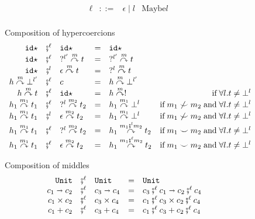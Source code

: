 \documentclass[acmsmall,review,anonymous]{acmart}\settopmatter{printfolios=true,printccs=false,printacmref=false}
\newcommand{\stxrule}[3]{#1 & ::= & #3 & \text{#2}\\}
\newcommand{\comprule}[4]{#1 & \fatsemi^\ell & #2 & = & #3 & #4 \\}
\newcommand{\comprulel}[4]{#1 & \fatsemi^l & #2 & = & #3 & #4 \\}
\newcommand{\plus}[0]{+}
\newcommand{\POOunit}[0]{\mathtt{Unit}}
\newcommand{\POOfun}[2]{#1 \shortrightarrow #2}
\newcommand{\POOprod}[2]{#1 \times #2}
\newcommand{\POOsum}[2]{#1 \plus #2}
\newcommand{\sidecond}[1]{\text{if}\;#1}
\newcommand{\hyperCoercionI}[0]{\mathtt{id\star}}
\newcommand{\hyperCoercionC}[3]{#1 \overset{#2}{\curvearrowright} #3}
\begin{document}
\begin{figure}
  \[
  \begin{array}{rclr}
  \stxrule{\ell}{Maybe$l$}{\epsilon \mid l}
  \end{array}
  \]
  
  Composition of hypercoercions 
  \[ 
  \begin{array}{rclclr}
  
  \comprule{
    \hyperCoercionI
  }{
    \hyperCoercionI
  }{
    \hyperCoercionI
  }{}
  
  \comprule{
    \hyperCoercionI
  }{
    \hyperCoercionC{?^{l'}}{m}{t}
  }{
    \hyperCoercionC{?^{l'}}{m}{t}
  }{}
  
  \comprulel{
    \hyperCoercionI
  }{
    \hyperCoercionC{\epsilon}{m}{t}
  }{
    \hyperCoercionC{?^{l}}{m}{t}
  }{}
  
  \comprule{
    \hyperCoercionC{h}{m}{\bot^{l'}}
  }{
    c
  }{
    \hyperCoercionC{h}{m}{\bot^{l'}}
  }{}
  
  \comprule{
    \hyperCoercionC{h}{m}{t}
  }{
    \hyperCoercionI
  }{
    \hyperCoercionC{h}{m}{!}
  }{
    \sidecond{\forall l. t \neq \bot^{l}}
  }
  
  \comprule{
    \hyperCoercionC{h_1}{m_1}{t_1}
  }{
    \hyperCoercionC{?^l}{m_2}{t_2}
  }{
    \hyperCoercionC{h_1}{m_1}{\bot^l}
  }{
    \sidecond{
       m_1 \not\smile m_2
      \; \text{and} \;
      \forall l. t \neq \bot^{l}
    }
  }

\comprulel{
\hyperCoercionC{h_1}{m_1}{t_1}
}{
\hyperCoercionC{\epsilon}{m_2}{t_2}
}{
\hyperCoercionC{h_1}{m_1}{\bot^l}
}{
\sidecond{
  m_1 \not\smile m_2
  \; \text{and} \;
  \forall l. t \neq \bot^{l}
}
}
\comprule{
\hyperCoercionC{h_1}{m_1}{t_1}
}{
\hyperCoercionC{?^l}{m_2}{t_2}
}{
\hyperCoercionC{h_1}{m_1 \fatsemi^{l} m_2}{t_2}
}{
\sidecond{
  m_1 \smile m_2
  \; \text{and} \;
  \forall l. t \neq \bot^{l}
}
}
  \comprule{
    \hyperCoercionC{h_1}{m_1}{t_1}
  }{
    \hyperCoercionC{\epsilon}{m_2}{t_2}
  }{
    \hyperCoercionC{h_1}{m_1 \fatsemi^{\ell} m_2}{t_2}
  }{
    \sidecond{
      m_1 \smile m_2
      \; \text{and} \;
      \forall l. t \neq \bot^{l}
    }
  }
  \end{array}
  \]
  
  Composition of middles 
  \[ 
  \begin{array}{rclclr}
  \comprule{\POOunit}{\POOunit}{
    \POOunit
  }{}
  \comprule{\POOfun{c_1}{c_2}}{\POOfun{c_3}{c_4}}{
    \POOfun{c_3 \fatsemi^{\ell} c_1}{c_2 \fatsemi^\ell c_4}
  }{}
  \comprule{\POOprod{c_1}{c_2}}{\POOprod{c_3}{c_4}}{
    \POOprod{c_1 \fatsemi^\ell c_3}{c_2 \fatsemi^\ell c_4}
  }{}
  \comprule{\POOsum{c_1}{c_2}}{\POOsum{c_3}{c_4}}{
    \POOsum{c_1 \fatsemi^\ell c_3}{c_2 \fatsemi^\ell c_4}
  }{}
  \end{array}
  \]
  

\end{figure}
\end{document}
